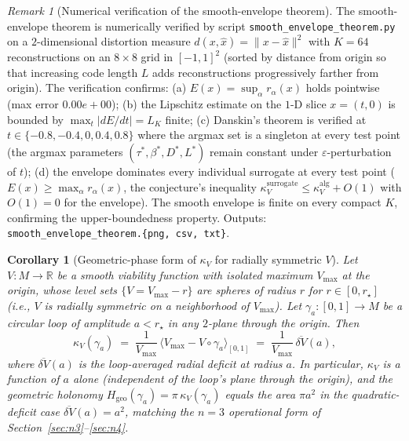 \documentclass[11pt,a4paper]{article}
\theoremstyle{plain}
\newtheorem{corollary}[theorem]{Corollary}
\theoremstyle{definition}
\theoremstyle{remark}
\newtheorem{remark}[theorem]{Remark}
\newcommand{\kk}{\kappa_{\!V}}
\newcommand{\RR}{\mathbb{R}}
\begin{document}
\begin{remark}[Numerical verification of the smooth-envelope theorem]
\label{rem:smooth-envelope-numeric}
The smooth-envelope theorem is numerically verified by script
\texttt{smooth\_envelope\_theorem.py} on a $2$-dimensional distortion
measure $d(x, \hat x) = \|x - \hat x\|^2$ with $K = 64$ reconstructions
on an $8 \times 8$ grid in $[-1, 1]^2$ (sorted by distance from origin
so that increasing code length $L$ adds reconstructions progressively
farther from origin). The verification confirms: (a) $E(x) =
\sup_\alpha r_\alpha(x)$ holds pointwise (max error $0.00e+00$); (b) the
Lipschitz estimate on the $1$-D slice $x = (t, 0)$ is bounded by
$\max_t |dE/dt| = L_K$ finite; (c) Danskin's theorem is verified at
$t \in \{-0.8, -0.4, 0, 0.4, 0.8\}$ where the argmax set is a singleton
at every test point (the argmax parameters $(\tau^*, \beta^*, D^*, L^*)$
remain constant under $\varepsilon$-perturbation of $t$); (d) the
envelope dominates every individual surrogate at every test point
($E(x) \geq \max_\alpha r_\alpha(x)$, the conjecture's inequality
$\kk^{\mathrm{surrogate}} \leq \kk^{\mathrm{alg}} + O(1)$ with $O(1) = 0$
for the envelope). The smooth envelope is finite on every compact $K$,
confirming the upper-boundedness property. Outputs:
\texttt{smooth\_envelope\_theorem.\{png, csv, txt\}}.
\end{remark}

\begin{corollary}[Geometric-phase form of $\kk$ for radially symmetric
$V$]\label{cor:kappa-geometric-phase}
Let $V : M \to \RR$ be a smooth viability function with isolated
maximum $V_{\max}$ at the origin, whose level sets
$\{V = V_{\max} - r\}$ are spheres of radius $r$ for $r \in [0, r_\star]$
(i.e., $V$ is radially symmetric on a neighborhood of $V_{\max}$). Let
$\gamma_a : [0,1] \to M$ be a circular loop of amplitude $a < r_\star$
in any $2$-plane through the origin. Then
\begin{equation}\label{eq:kappa-radial}
  \kk(\gamma_a) \;=\; \frac{1}{V_{\max}}\,\langle V_{\max} - V\circ\gamma_a\rangle_{[0,1]}
  \;=\; \frac{1}{V_{\max}}\,\overline{\delta V}(a),
\end{equation}
where $\overline{\delta V}(a)$ is the loop-averaged radial deficit at
radius $a$. In particular, $\kk$ is a function of $a$ alone (independent
of the loop's plane through the origin), and the geometric holonomy
$H_{\mathrm{geo}}(\gamma_a) = \pi\,\kk(\gamma_a)$ equals the area
$\pi a^2$ in the quadratic-deficit case $\overline{\delta V}(a) =
a^2$, matching the $n=3$ operational form of
Section~\ref{sec:n3}--\ref{sec:n4}.
\end{corollary}
\end{document}
